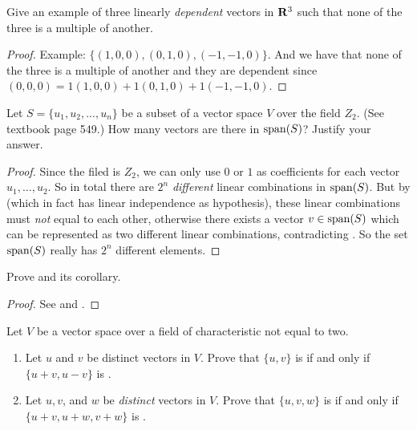 \begin{exercise} \label{exercise 1.5.10}
Give an example of three linearly \emph{dependent} vectors in \(\mathbf{R}^3\) such that none of the three is a multiple of another.
\end{exercise}

\begin{proof}
Example: \(\{ (1, 0, 0), (0, 1, 0), (-1, -1, 0) \}\).
And we have that none of the three is a multiple of another and they are dependent since \((0, 0, 0) = 1(1, 0, 0) + 1(0, 1, 0) + 1(-1, -1, 0)\).
\end{proof}

\begin{exercise} \label{exercise 1.5.11}
Let \(S = \{ u_1, u_2, ..., u_n \}\) be a \LID{} subset of a vector space \(V\) over the field \(Z_2\).
(See textbook page 549.)
How many vectors are there in \(\operatorname{span}(S)\)?
Justify your answer.
\end{exercise}

\begin{proof}
Since the filed is \(Z_2\), we can only use \(0\) or \(1\) as coefficients for each vector \(u_1, ..., u_2\).
So in total there are \(2^n\) \emph{different} linear combinations in \(\operatorname{span}(S)\).
But by  (which in fact has linear independence as hypothesis), these linear combinations must \emph{not} equal to each other, otherwise there exists a vector \(v \in \operatorname{span}(S)\) which can be represented as two different linear combinations, contradicting .
So the set \(\operatorname{span}(S)\) really has \(2^n\) different elements.
\end{proof}

\begin{exercise} \label{exercise 1.5.12}
Prove  and its corollary.
\end{exercise}

\begin{proof}
See  and .
\end{proof}

\begin{exercise} \label{exercise 1.5.13}
Let \(V\) be a vector space over a field of characteristic not equal to two.
\begin{enumerate}
\item Let \(u\) and \(v\) be distinct vectors in \(V\).
      Prove that \(\{ u, v \}\) is \LID{} if and only if \(\{ u + v, u - v\}\) is \LID{}.
\item Let \(u, v\), and \(w\) be \emph{distinct} vectors in \(V\).
      Prove that \(\{ u, v, w \}\) is \LID{} if and only if \(\{ u + v, u + w, v + w \}\) is \LID{}.
\end{enumerate}
\end{exercise}


